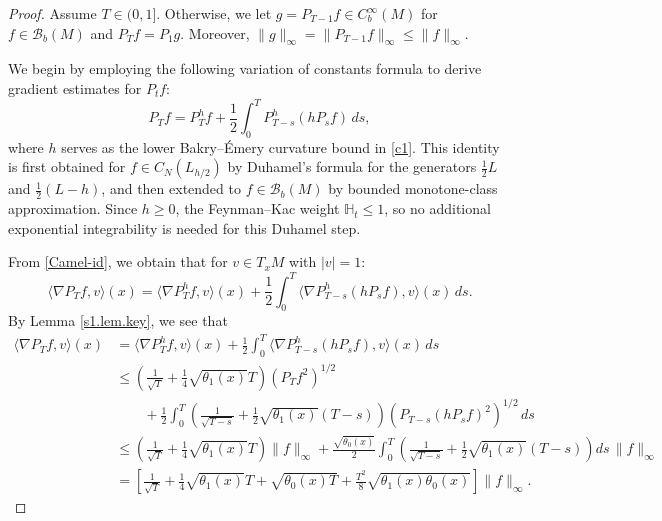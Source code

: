 \documentclass[11pt,twoside, reqno]{article}
\def\r{\right}
\def\lf{\left}
\newcommand\1{\mathbbm{1}}
\theoremstyle{definition}
\numberwithin{equation}{section}
\begin{document}
\begin{proof}
Assume $T\in (0,1]$. Otherwise, we let $g=P_{T-1}f\in C_b^{\infty}(M)$ for $f\in \mathcal{B}_b(M)$ and $P_Tf=P_1g$. 
Moreover, $\|g\|_{\infty}=\|P_{T-1}f\|_{\infty}\leq \|f\|_{\infty}$. 

We begin by employing the following  variation of constants formula  to derive gradient estimates for $P_tf$:
\begin{equation}\label{Camel-id}
    P_Tf= P_T^hf+\frac{1}{2}\int_0^T P_{T-s}^h(h P_sf)\,ds, 
\end{equation}
where $h$ serves as the lower Bakry--Émery curvature bound in \eqref{c1}.  This identity is first obtained for $f\in C_N(L_{h/2})$ by Duhamel's formula for the generators $\frac12L$ and $\frac12(L-h)$, and then extended to $f\in\mathcal B_b(M)$ by bounded monotone-class approximation. Since \(h\ge0\), the Feynman--Kac weight \(\mathbb{H}_t\le1\), so no additional exponential integrability is needed for this Duhamel step.



From \eqref{Camel-id}, we obtain that for $v\in T_xM$ with $|v|=1$:
\[
\langle\nabla  P_T f, v\rangle (x)= \langle\nabla P_T^h f,  v\rangle(x) + \frac{1}{2}\int_0^T \langle\nabla P_{T-s}^h (h P_{s} f), v\rangle(x) \, ds.
\]
By Lemma \ref{s1.lem.key}, we see that
\begin{align*}
\langle\nabla  P_T f, v\rangle (x)&= \langle\nabla P_T^h f,  v\rangle(x) + \frac{1}{2}\int_0^T \langle\nabla P_{T-s}^h (h P_{s} f), v\rangle(x) \, ds\\
&\leq  \lf( \frac{1}{\sqrt{T}}+\frac{1}{4}\sqrt{\theta_1(x)}T\r)(P_Tf^2)^{1/2}\\
&\qquad +\frac{1}{2} \int_0^T\lf( \frac{1}{\sqrt{T-s}}+\frac{1}{2} \sqrt{\theta_1(x)}(T-s)\r)(P_{T-s} (hP_{s}f)^2)^{1/2}\, ds\\
&\leq  \lf( \frac{1}{\sqrt{T}}+\frac{1}{4}\sqrt{\theta_1(x)}T\r)\|f\|_{\infty}+\frac{\sqrt{\theta_0(x)}}{2} \int_0^T\lf( \frac{1}{\sqrt{T-s}}+\frac{1}{2}\sqrt{\theta_1(x)}(T-s)\r) ds\,  \|f\|_{\infty}\\
&= \lf[ \frac{1}{\sqrt{T}}+\frac{1}{4}\sqrt{\theta_1(x)}T+\sqrt{\theta_0(x)T}+\frac{T^2}{8}\sqrt{\theta_1(x)\theta_0(x)}\r]\|f\|_{\infty}.
\end{align*}


\end{proof}
\end{document}
